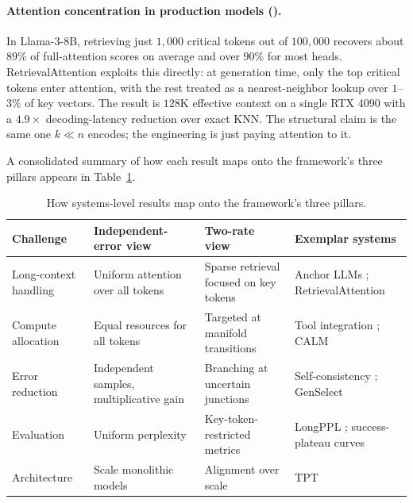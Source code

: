 \paragraph{Attention concentration in production models (\citet{liu2024retrieval}).}
In Llama-3-8B, retrieving just $1{,}000$ critical tokens out of $100{,}000$ recovers about $89\%$ of full-attention scores on average and over $90\%$ for most heads. RetrievalAttention exploits this directly: at generation time, only the top critical tokens enter attention, with the rest treated as a nearest-neighbor lookup over $1$--$3\%$ of key vectors. The result is $128$K effective context on a single RTX 4090 with a $4.9\times$ decoding-latency reduction over exact KNN. The structural claim is the same one $k \ll n$ encodes; the engineering is just paying attention to it.

A consolidated summary of how each result maps onto the framework's three pillars appears in Table~\ref{tab:implications}.

\begin{table}[ht]
\caption{How systems-level results map onto the framework's three pillars.}
\label{tab:implications}
\centering
\small
\begin{tabular}{p{2.6cm}p{3cm}p{3cm}p{3.5cm}}
\toprule
\textbf{Challenge} & \textbf{Independent-error view} & \textbf{Two-rate view} & \textbf{Exemplar systems} \\
\midrule
Long-context handling & Uniform attention over all tokens & Sparse retrieval focused on key tokens & Anchor LLMs \citep{pang2024anchor}; RetrievalAttention \citep{liu2024retrieval} \\
\midrule
Compute allocation & Equal resources for all tokens & Targeted at manifold transitions & Tool integration \citep{moshkov2025aimo}; CALM \citep{schuster2022calm} \\
\midrule
Error reduction & Independent samples, multiplicative gain & Branching at uncertain junctions & Self-consistency \citep{wang2023self}; GenSelect \citep{moshkov2025aimo} \\
\midrule
Evaluation & Uniform perplexity & Key-token-restricted metrics & LongPPL \citep{fang2024what}; success-plateau curves \citep{costello2025think} \\
\midrule
Architecture & Scale monolithic models & Alignment over scale & TPT \citep{costello2025think} \\
\bottomrule
\end{tabular}
\end{table}

